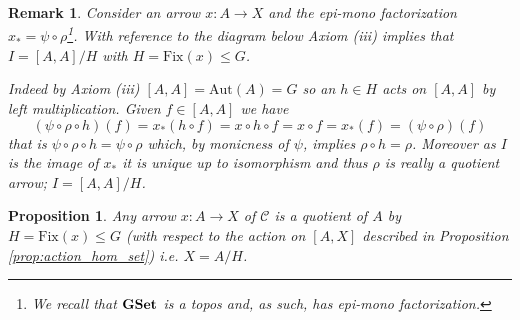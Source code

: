 \documentclass[italian, 12pt, reqno]{article}
\theoremstyle{myteo}
\newtheorem{proposition}[theorem]{Proposition}
\newtheorem{remark}[theorem]{Remark}
\numberwithin{equation}{section}
\newcommand{\cat}[1]{\mathscr{#1}}
\newcommand{\aut}{\text{Aut}}
\newcommand{\gset}{\text{\textbf{GSet}}}
\newcommand{\fix}[1]{\text{Fix}(#1)}
\newcommand{\homs}[2]{[#1, #2]}
\newcommand{\fun}[3]{#1\colon#2\to #3}
\begin{document}
\begin{remark}
  \label{rem:axiom2}
  Consider an arrow \(\fun{x}{A}{X}\) and the epi-mono factorization \(x_* = \psi\circ \rho\)\footnote{We recall that \(\gset\) is a topos and, as such, has epi-mono factorization.}.
  With reference to the diagram below Axiom (iii) implies that \(I = \homs{A}{A}/H\) with \(H = \fix{x}\leq G\).

  \begin{center}
  \end{center}

  Indeed by Axiom (iii) \(\homs{A}{A} = \aut(A) = G\) so an \(h\in H\) acts on \(\homs{A}{A}\) by left multiplication.
  Given \(f\in\homs{A}{A}\) we have
  \[(\psi\circ \rho\circ h)(f) = x_*(h\circ f) = x\circ h\circ f = x\circ f = x_*(f) = (\psi\circ \rho)(f)\]
  that is \(\psi\circ\rho\circ h = \psi\circ\rho\) which, by monicness of \(\psi\), implies \(\rho\circ h = \rho\).
  Moreover as \(I\) is the image of \(x_*\) it is unique up to isomorphism and thus \(\rho\) is really a quotient arrow; \(I = \homs{A}{A}/H\).
\end{remark}

\begin{proposition}
  \label{prop:epsilon_iso}
  Any arrow \(\fun{x}{A}{X}\) of \(\cat{C}\) is a quotient of \(A\) by \(H = \fix{x}\leq G\) (with respect to the action on \(\homs{A}{X}\) described in Proposition \ref{prop:action_hom_set}) i.e. \(X = A/H\).
\end{proposition}
\end{document}
